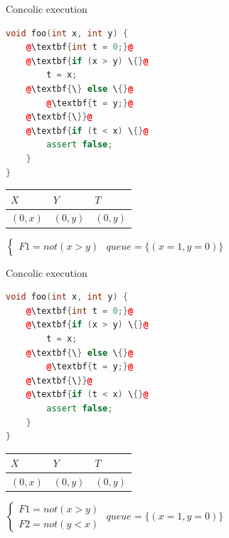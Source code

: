 \documentclass{beamer}
\begin{document}
\begin{frame}[fragile]{Concolic execution}
\begin{minipage}{0.49\textwidth}
\begin{lstlisting}[language=C++,escapechar=@]
void foo(int x, int y) {
    @\textbf{int t = 0;}@
    @\textbf{if (x > y) \{}@
        t = x;
    @\textbf{\} else \{}@
        @\textbf{t = y;}@
    @\textbf{\}}@
    @\textbf{if (t < x) \{}@
        assert false;
    }
}
\end{lstlisting}
\end{minipage}
\hfill
\begin{minipage}{0.49\textwidth}
\begin{center}
\begin{tabular}{ | l | l | l | }
\hline
$X$ & $Y$ & $T$ \\
\hline
$(0, x)$ & $(0, y)$ & $(0, y)$ \\
\hline
\end{tabular}
$\left\{
\begin{array}{l}
F1 = not (x > y)
\end{array}
\right.$
$queue = \{(x = 1, y = 0)\}$
\end{center}
\end{minipage}
\end{frame}

\begin{frame}[fragile]{Concolic execution}
\begin{minipage}{0.49\textwidth}
\begin{lstlisting}[language=C++,escapechar=@]
void foo(int x, int y) {
    @\textbf{int t = 0;}@
    @\textbf{if (x > y) \{}@
        t = x;
    @\textbf{\} else \{}@
        @\textbf{t = y;}@
    @\textbf{\}}@
    @\textbf{if (t < x) \{}@
        assert false;
    }
}
\end{lstlisting}
\end{minipage}
\hfill
\begin{minipage}{0.49\textwidth}
\begin{center}
\begin{tabular}{ | l | l | l | }
\hline
$X$ & $Y$ & $T$ \\
\hline
$(0, x)$ & $(0, y)$ & $(0, y)$ \\
\hline
\end{tabular}
$\left\{
\begin{array}{l}
F1 = not (x > y) \\
F2 = not (y < x)
\end{array}
\right.$
$queue = \{(x = 1, y = 0)\}$
\end{center}
\end{minipage}
\end{frame}
\end{document}
